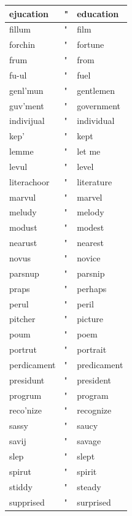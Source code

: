 \documentclass[10pt]{article}
\begin{document}
\begin{center}
\begin{tabular}{|l|l|l|}
\hline
ejucation & " & education \\
\hline
fillum & " & film \\
\hline
forchin & " & fortune \\
\hline
frum & " & from \\
\hline
fu-ul & " & fuel \\
\hline
genl'mun & " & gentlemen \\
\hline
guv'ment & " & government \\
\hline
indivijual & " & individual \\
\hline
kep' & " & kept \\
\hline
lemme & " & let me \\
\hline
levul & " & level \\
\hline
literachoor & " & literature \\
\hline
marvul & " & marvel \\
\hline
meludy & " & melody \\
\hline
modust & " & modest \\
\hline
nearust & " & nearest \\
\hline
novus & " & novice \\
\hline
parsnup & " & parsnip \\
\hline
praps & " & perhaps \\
\hline
perul & " & peril \\
\hline
pitcher & " & picture \\
\hline
poum & " & poem \\
\hline
portrut & " & portrait \\
\hline
perdicament & " & predicament \\
\hline
presidunt & " & president \\
\hline
progrum & " & program \\
\hline
reco'nize & " & recognize \\
\hline
sassy & " & saucy \\
\hline
savij & " & savage \\
\hline
slep & " & slept \\
\hline
spirut & " & spirit \\
\hline
stiddy & " & steady \\
\hline
supprised & " & surprised \\
\hline
\end{tabular}
\end{center}
\end{document}
